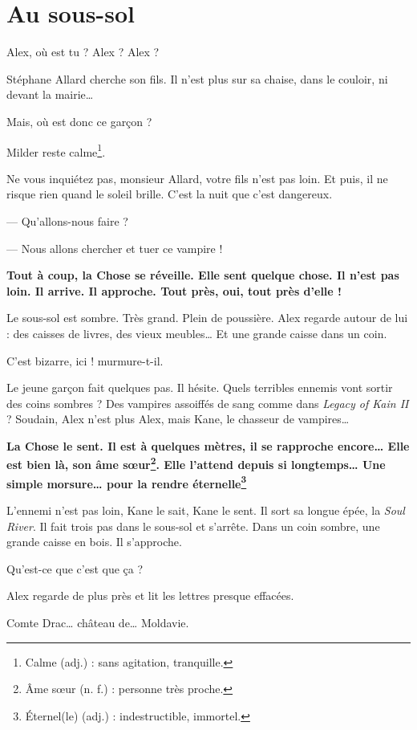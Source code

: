 \chapter{Au sous-sol}
\og Alex, où est tu ? Alex ? Alex ? \fg{}

Stéphane Allard cherche son fils. Il n'est plus sur sa chaise, dans le couloir, ni devant la mairie\ldots{}

\og Mais, où est donc ce gar\c{c}on ? \fg{}

Milder reste calme\footnote{Calme (adj.) : sans agitation, tranquille.}.

\og Ne vous inquiétez pas, monsieur Allard, votre fils n'est pas loin. Et puis, il ne risque rien quand le soleil brille. C'est
la nuit que c'est dangereux.

--- Qu'allons-nous faire ?

--- Nous allons chercher et tuer ce vampire ! \fg{}

\textbf{Tout à coup, la Chose se réveille. Elle sent quelque chose. Il n'est pas loin. Il arrive. Il approche. Tout près, oui,
tout près d'elle !}

Le sous-sol est sombre. Très grand. Plein de poussière. Alex regarde autour de lui : des caisses de livres, des vieux
meubles\ldots{} Et une grande caisse dans un coin.

\og C'est bizarre, ici ! murmure-t-il. \fg{}

Le jeune gar\c{c}on fait quelques pas. Il hésite. Quels terribles ennemis vont sortir des coins sombres ? Des vampires assoiffés
de sang comme dans \emph{Legacy of Kain II} ? Soudain, Alex n'est plus Alex, mais Kane, le chasseur de vampires\ldots{}

\textbf{La Chose le sent. Il est à quelques mètres, il se rapproche encore\ldots{} Elle est bien là, son âme s\oe{}ur\footnote{Âme
s\oe{}ur (n. f.) : personne très proche.}. Elle l'attend depuis si longtemps\ldots{} Une simple morsure\ldots{} pour la rendre
éternelle\footnote{Éternel(le) (adj.) : indestructible, immortel.}}

L'ennemi n'est pas loin, Kane le sait, Kane le sent. Il sort sa longue épée, la \emph{Soul River}. Il fait trois pas dans le
sous-sol et s'arrête. Dans un coin sombre, une grande caisse en bois. Il s'approche.

\og Qu'est-ce que c'est que \c{c}a ? \fg{}

Alex regarde de plus près et lit les lettres presque effacées.

\og Comte Drac\ldots{} château de\ldots{} Moldavie. \fg{}

